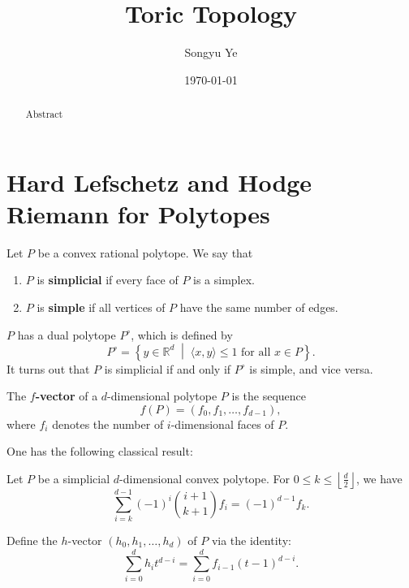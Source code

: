 \documentclass[12pt]{article}
\begin{document}
\rhead{\today}
\cfoot{\thepage}

\title{Toric Topology}

\author{Songyu Ye}
\date{\today}
\maketitle


\begin{abstract}
    Abstract
\end{abstract}

\tableofcontents

\section{Hard Lefschetz and Hodge Riemann for Polytopes}
\begin{definition}
    Let $P$ be a convex rational polytope. We say that \begin{enumerate}
        \item $P$ is \textbf{simplicial} if every face of $P$ is a simplex.
        \item $P$ is \textbf{simple} if all vertices of $P$ have the same number of edges.
    \end{enumerate}
\end{definition}
$P$ has a dual polytope $P^\circ$, which is defined by
\[
    P^\circ = \left\{ y \in \mathbb{R}^d \;\middle|\; \langle x, y \rangle \leq 1 \text{ for all } x \in P \right\}.
\]
It turns out that $P$ is simplicial if and only if $P^\circ$ is simple, and vice versa.

\begin{definition}
    The \textbf{$f$-vector} of a $d$-dimensional polytope $P$ is the sequence
    \[
        f(P) = (f_0, f_1, \dots, f_{d-1}),
    \]
    where $f_i$ denotes the number of $i$-dimensional faces of $P$.
\end{definition}

One has the following classical result:
\begin{theorem}
    Let \( P \) be a simplicial \( d \)-dimensional convex polytope. For \( 0 \leq k \leq \left\lfloor \frac{d}{2} \right\rfloor \), we have
    \[
    \sum_{i = k}^{d - 1} (-1)^i \binom{i + 1}{k + 1} f_i = (-1)^{d - 1} f_k.
    \]
\end{theorem}
    
    \begin{definition}
        Define the \( h \)-vector \( (h_0, h_1, \dots, h_d) \) of \( P \) via the identity:
        \[
        \sum_{i=0}^d h_i t^{d - i} = \sum_{i = 0}^d f_{i - 1} (t - 1)^{d - i}.
        \]
    \end{definition}
\end{document}
